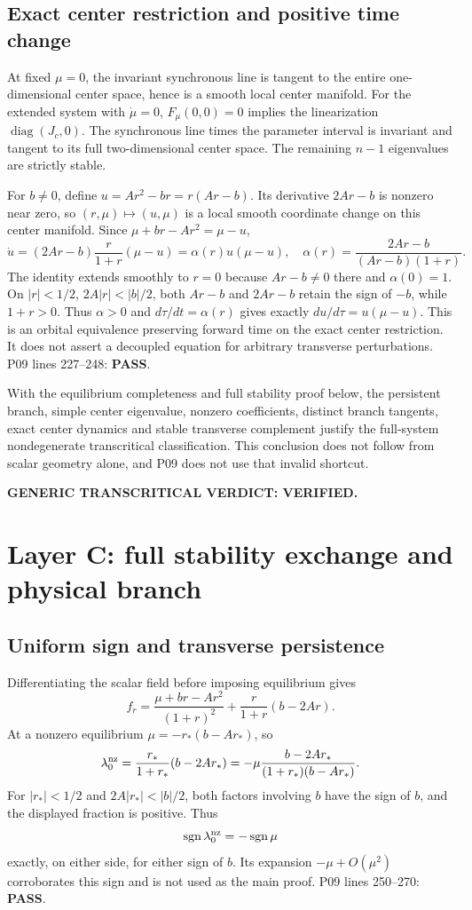 \documentclass[11pt]{article}
\newcommand{\lin}[1]{P09 lines #1}
\newcommand{\pass}{\textbf{PASS}}
\begin{document}
\subsection{Exact center restriction and positive time change}
At fixed $\mu=0$, the invariant synchronous line is tangent to the entire
one-dimensional center space, hence is a smooth local center manifold.
For the extended system with $\dot\mu=0$, $F_\mu(0,0)=0$ implies the
linearization $\operatorname{diag}(J_c,0)$. The synchronous line times the
parameter interval is invariant and tangent to its full two-dimensional
center space. The remaining $n-1$ eigenvalues are strictly stable.

For $b\ne0$, define $u=Ar^2-br=r(Ar-b)$. Its derivative
$2Ar-b$ is nonzero near zero, so $(r,\mu)\mapsto(u,\mu)$ is a local
smooth coordinate change on this center manifold. Since
$\mu+br-Ar^2=\mu-u$,
\[
 \dot u=(2Ar-b)\frac{r}{1+r}(\mu-u)
        =\alpha(r)u(\mu-u),\quad
 \alpha(r)=\frac{2Ar-b}{(Ar-b)(1+r)}.
\]
The identity extends smoothly to $r=0$ because $Ar-b\ne0$ there and
$\alpha(0)=1$. On $|r|<1/2$, $2A|r|<|b|/2$, both $Ar-b$ and
$2Ar-b$ retain the sign of $-b$, while $1+r>0$. Thus $\alpha>0$ and
$d\tau/dt=\alpha(r)$ gives exactly $du/d\tau=u(\mu-u)$.
This is an orbital equivalence preserving forward time on the exact center
restriction. It does not assert a decoupled equation for arbitrary
transverse perturbations. \lin{227--248}: \pass.

With the equilibrium completeness and full stability proof below, the
persistent branch, simple center eigenvalue, nonzero coefficients, distinct
branch tangents, exact center dynamics and stable transverse complement
justify the full-system nondegenerate transcritical classification. This
conclusion does not follow from scalar geometry alone, and P09 does not
use that invalid shortcut.

\textbf{GENERIC TRANSCRITICAL VERDICT: VERIFIED.}

\section{Layer C: full stability exchange and physical branch}
\label{sec:stability}
\subsection{Uniform sign and transverse persistence}
Differentiating the scalar field before imposing equilibrium gives
\[
 f_r=\frac{\mu+br-Ar^2}{(1+r)^2}
       +\frac{r}{1+r}(b-2Ar).
\]
At a nonzero equilibrium $\mu=-r_*(b-Ar_*)$, so
\[
 \lambda_0^{\rm nz}
 =\frac{r_*}{1+r_*}(b-2Ar_*)
 =-\mu\frac{b-2Ar_*}{(1+r_*)(b-Ar_*)}.
\]
For $|r_*|<1/2$ and $2A|r_*|<|b|/2$, both factors involving $b$
have the sign of $b$, and the displayed fraction is positive. Thus
\[
 \operatorname{sgn}\lambda_0^{\rm nz}=-\operatorname{sgn}\mu
\]
exactly, on either side, for either sign of $b$. Its expansion
$-\mu+O(\mu^2)$ corroborates this sign and is not used as the main proof.
\lin{250--270}: \pass.
\end{document}
